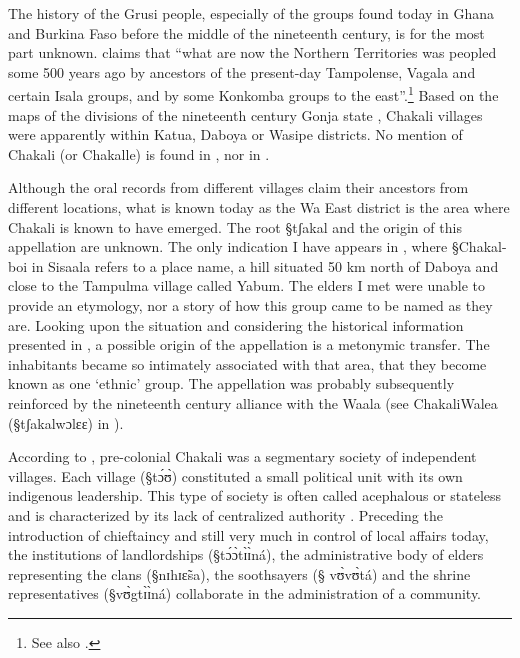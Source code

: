 The history of the Grusi people, especially of the groups found today in Ghana
and
Burkina Faso before the middle of the nineteenth century, is for the most part
unknown.  \citet[13]{Mano51}  claims that ``what are now the
Northern Territories was peopled some 500 years ago by ancestors of the
present-day Tampolense, Vagala and certain Isala groups, and by some Konkomba
groups to the east''.\footnote{See also \citet[516-7]{Ratt32b}.} Based on the
maps of the divisions of the nineteenth century Gonja state
\citep{Good67, Wilk86},  Chakali villages were apparently within Katua, Daboya
or Wasipe districts. No
mention of Chakali (or Chakalle) is found in \cite{Good67, Wilk86}, nor in
\cite{Dupe84}.  

Although the oral records from different villages claim their ancestors from
different locations, what is known today as the Wa East district is the area
where Chakali is
known to have emerged. The root {\S tʃakal} and the origin of this
appellation are unknown.  The only
indication I have appears in \citet[479]{Ratt32b}, where {\S Chakal-boi} in
Sisaala refers to a place name, a hill situated  50 km north of Daboya and
close to the Tampulma village called Yabum. The elders I  met were unable
to provide an etymology, nor a story of how this group came to be named as  
they are. Looking upon the situation and considering the historical information
presented in \cite{Ratt32a, Ratt32b, Good54, Wilk89, Daan92b, Daan94, Sali08}, 
a
possible origin of the  appellation is a metonymic transfer.   The
inhabitants  became so  intimately associated with that area,  that
they become
known as one `ethnic' group. The appellation was probably subsequently
reinforced by the nineteenth century alliance with the Waala (see ChakaliWalea
({\S tʃakalwɔlɛɛ}) in \citet[63]{Daan94}).


According to \citet[77]{Daan92}, pre-colonial Chakali was a segmentary
society of independent  villages.  Each village  ({\S tɔ́ʊ̀}) constituted
a
small political
unit with its own indigenous leadership. This type of society is often called
acephalous or stateless and is characterized by its lack of centralized
authority \citep[see Group B in][5]{Fort40}. Preceding the introduction
of chieftaincy and still very much in control of local affairs today,  the
institutions of  landlordships ({\S tɔ́ɔ̀tɪ̀ɪ̀ná}), the administrative body of
elders representing the clans  ({\S nɪhɪɛ̃sa}), the soothsayers ({\S
vʊ̀vʊ̀tá}) and the
shrine 
representatives  ({\S vʊ̀gtɪ̀ɪ̀ná}) collaborate in the administration of a
community.

